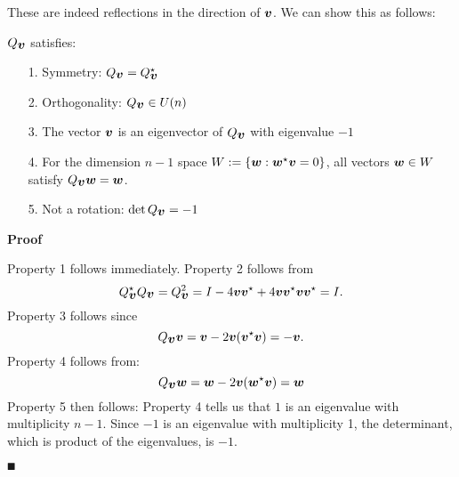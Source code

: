 These are indeed reflections in the direction of $\bm{{\mbox{\boldmath$v$\unboldmath}}}$. We can show this as follows:

\begin{proposition} $Q_{\bm{{\mbox{\boldmath$v$\unboldmath}}}}$ satisfies:

\begin{itemize}
\item[1. ] Symmetry: $Q_{\bm{{\mbox{\boldmath$v$\unboldmath}}}} = Q_{\bm{{\mbox{\boldmath$v$\unboldmath}}}}^\star$


\item[2. ] Orthogonality: $Q_{\bm{{\mbox{\boldmath$v$\unboldmath}}}} \in U(n)$


\item[3. ] The vector $\bm{{\mbox{\boldmath$v$\unboldmath}}}$ is an eigenvector of $Q_{\bm{{\mbox{\boldmath$v$\unboldmath}}}}$ with eigenvalue $-1$


\item[4. ] For the dimension $n-1$ space $W := \{\bm{{\mbox{\boldmath$w$\unboldmath}}} : \bm{{\mbox{\boldmath$w$\unboldmath}}}^\star \bm{{\mbox{\boldmath$v$\unboldmath}}} = 0 \}$, all vectors $\bm{{\mbox{\boldmath$w$\unboldmath}}} \in W$ satisfy $Q_{\bm{{\mbox{\boldmath$v$\unboldmath}}}}\bm{{\mbox{\boldmath$w$\unboldmath}}} = \bm{{\mbox{\boldmath$w$\unboldmath}}}$.


\item[5. ] Not a rotation: $\det Q_{\bm{{\mbox{\boldmath$v$\unboldmath}}}} = -1$

\end{itemize}
\end{proposition}
\textbf{Proof}

Property 1 follows immediately. Property 2 follows from
\[
Q_{\bm{{\mbox{\boldmath$v$\unboldmath}}}}^\star Q_{\bm{{\mbox{\boldmath$v$\unboldmath}}}} = Q_{\bm{{\mbox{\boldmath$v$\unboldmath}}}}^2 = I - 4 \bm{{\mbox{\boldmath$v$\unboldmath}}} \bm{{\mbox{\boldmath$v$\unboldmath}}}^\star + 4 \bm{{\mbox{\boldmath$v$\unboldmath}}} \bm{{\mbox{\boldmath$v$\unboldmath}}}^\star \bm{{\mbox{\boldmath$v$\unboldmath}}} \bm{{\mbox{\boldmath$v$\unboldmath}}}^\star = I.
\]
Property 3 follows since
\[
Q_{\bm{{\mbox{\boldmath$v$\unboldmath}}}} \bm{{\mbox{\boldmath$v$\unboldmath}}} = \bm{{\mbox{\boldmath$v$\unboldmath}}} - 2\bm{{\mbox{\boldmath$v$\unboldmath}}} (\bm{{\mbox{\boldmath$v$\unboldmath}}}^\star\bm{{\mbox{\boldmath$v$\unboldmath}}}) = -\bm{{\mbox{\boldmath$v$\unboldmath}}}.
\]
Property 4 follows from:
\[
Q_{\bm{{\mbox{\boldmath$v$\unboldmath}}}} \bm{{\mbox{\boldmath$w$\unboldmath}}} = \bm{{\mbox{\boldmath$w$\unboldmath}}} - 2 \bm{{\mbox{\boldmath$v$\unboldmath}}} (\bm{{\mbox{\boldmath$w$\unboldmath}}}^\star \bm{{\mbox{\boldmath$v$\unboldmath}}}) =  \bm{{\mbox{\boldmath$w$\unboldmath}}}
\]
Property 5 then follows: Property 4 tells us that $1$ is an eigenvalue with multiplicity $n-1$. Since $-1$ is an eigenvalue with multiplicity 1,  the determinant, which is product of the eigenvalues, is $-1$.

\ensuremath{\QED}

